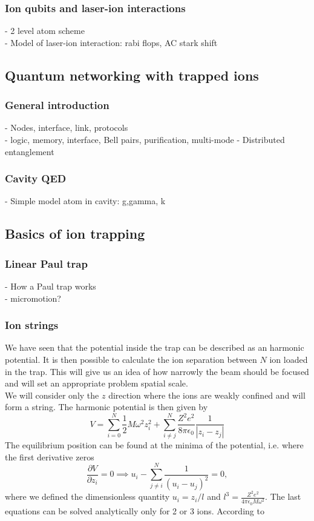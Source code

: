 \documentclass[english, a4paper, 12pt, twoside]{article}
\numberwithin{equation}{section} %
\begin{document}
\subsubsection{Ion qubits and laser-ion interactions}
- 2 level atom scheme\\
- Model of laser-ion interaction: rabi flops, AC stark shift
\subsection{Quantum networking with trapped ions}
\subsubsection{General introduction}
- Nodes, interface, link, protocols\\
- logic, memory, interface, Bell pairs, purification, multi-mode
- Distributed entanglement
\subsubsection{Cavity QED}
- Simple model atom in cavity: g,gamma, k
\subsection{Basics of ion trapping}
\subsubsection{Linear Paul trap}
- How a Paul trap works\\
- micromotion?
\subsubsection{Ion strings}
We have seen that the potential inside the trap can be described as an harmonic potential. It is then possible to calculate the ion separation between $N$ ion loaded in the trap. This will give us an idea of how narrowly the beam should be focused and will set an appropriate problem spatial scale.\\
We will consider only the $z$ direction where the ions are weakly confined and will form a string. The harmonic potential is then given by
\begin{equation}
V = \sum_{i=0}^N \frac{1}{2}M\omega^2z_i^2 + \sum_{i\neq j}^N\frac{Z^2e^2}{8\pi \epsilon_0}\frac{1}{|z_i-z_j|}
\end{equation}
The equilibrium position can be found at the minima of the potential, i.e. where the first derivative zeros
\begin{equation}
\frac{\partial V}{\partial z_i} = 0 \implies u_i - \sum_{j\neq i}^{N} \frac{1}{(u_i-u_j)^2}= 0,
\end{equation}
where we defined the dimensionless quantity $u_i = z_i/l$ and $l^3 = \displaystyle\frac{Z^2 e^2 }{4\pi \epsilon_0 M\omega^2}$.
The last equations can be solved analytically only for 2 or 3 ions.
According to \cite{ion_spacing}
\end{document}
